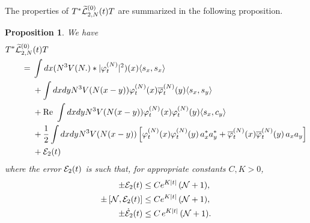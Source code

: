 \documentclass[11pt,a4paper]{article}
\newtheorem{proposition}[thm]{Proposition}
\newcommand{\ech}[2]{#2}	%
\newcommand{\ekt}{e^{K\lvert t\rvert}}	%
\newcommand{\wt}{\widetilde}
\newcommand{\cE}{{\cal E}}
\newcommand{\cL}{{\cal L}}
\newcommand{\cN}{{\cal N}}
\begin{document}
The properties of $T^* \wt{\cL}_{2,N}^{(0)} (t) T$ are summarized in the following proposition.
\begin{proposition}\label{prop:TwtL2T}
We have 
\begin{equation} \begin{split} 
T^* \wt{\cL}_{2,N}^{(0)} &(t) T \\ =\; & \int dx (N^3 V(N.) * |\varphi_t^{(N)}|^2) (x) \langle s_x , s_x \rangle \\ &+ \int dx dy N^3 V(N (x-y)) \varphi_t^{(N)} (x) \overline{\varphi}_t^{(N)} (y) \langle s_x , s_y \rangle \\ &+ \text{Re } \int dx dy N^3 V(N (x-y)) \varphi_t^{(N)} (x) \varphi_t^{(N)} (y) \langle s_x ,c_y \rangle \\ &+ \frac{1}{2} \int dx dy N^3 V(N (x-y)) \left[ \varphi_t^{(N)} (x) \varphi_t^{(N)} (y)\, a_x^* a_y^*  + \overline{\varphi}_t^{(N)} (x) \overline{\varphi}_t^{(N)} (y) \, a_x a_y \right]  \\ &+ \cE_2 (t) \end{split} \end{equation}
where the error $\cE_2 (t)$ is such that, for appropriate constants $C,K > 0$,
\begin{equation} \label{eq:T2T-cl}
\begin{split}
\pm  \cE_2 (t) &\leq C \ech{\| \varphi_t^{(N)} \|_{H^2}^2}{\ekt} \,  (\cN + 1), \\  \pm \left[ \cN , \cE_2 (t) \right]  &\leq C \ech{\| \varphi_t^{(N)} \|_{H^2}^2}{\ekt} \, (\cN + 1), \\ \pm \dot{\cE}_2 (t) &\leq C \, \ech{\left(\| \varphi_t^{(N)} \|_{H^4} \| \varphi_t^{(N)} \|_{H^2} +   \| \varphi_t^{(N)} \|_{H^2}^3 \right)}{\ekt} \, (\cN+1) .
\end{split}
\end{equation} 
\end{proposition}
\end{document}
